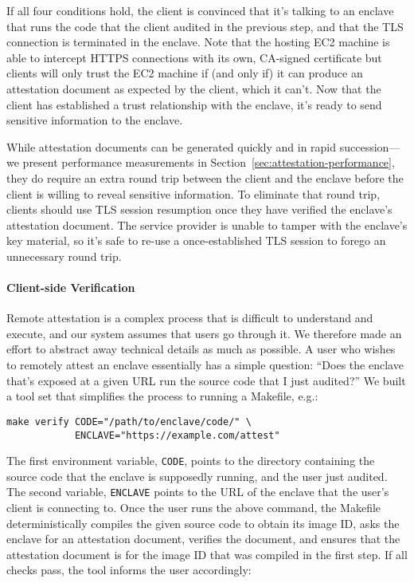 If all four conditions hold, the client is convinced that it's talking to an enclave that runs the code that the client audited in the previous step, and that the TLS connection is terminated in the enclave.  Note that the hosting EC2 machine is able to intercept HTTPS connections with its own, CA-signed certificate but clients will only trust the EC2 machine if (and only if) it can produce an attestation document as expected by the client, which it can't.  Now that the client has established a trust relationship with the enclave, it's ready to send sensitive information to the enclave.

While attestation documents can be generated quickly and in rapid succession---we present performance measurements in Section~\ref{sec:attestation-performance}, they do require an extra round trip between the client and the enclave before the client is willing to reveal sensitive information.  To eliminate that round trip, clients should use TLS session resumption once they have verified the enclave's attestation document.  The service provider is unable to tamper with the enclave's key material, so it's safe to re-use a once-established TLS session to forego an unnecessary round trip.

\paragraph{Client-side Verification}

Remote attestation is a complex process that is difficult to understand and execute, and our system assumes that users go through it.  We therefore made an effort to abstract away technical details as much as possible.  A user who wishes to remotely attest an enclave essentially has a simple question: ``Does the enclave that's exposed at a given URL run the source code that I just audited?''  We built a tool set that simplifies the process to running a Makefile, e.g.:

\begin{lstlisting}
make verify CODE="/path/to/enclave/code/" \
            ENCLAVE="https://example.com/attest"
\end{lstlisting}

The first environment variable, \texttt{CODE}, points to the directory containing the source code that the enclave is supposedly running, and the user just audited.  The second variable, \texttt{ENCLAVE} points to the URL of the enclave that the user's client is connecting to.  Once the user runs the above command, the Makefile deterministically compiles the given source code to obtain its image ID, asks the enclave for an attestation document, verifies the document, and ensures that the attestation document is for the image ID that was compiled in the first step.  If all checks pass, the tool informs the user accordingly:

